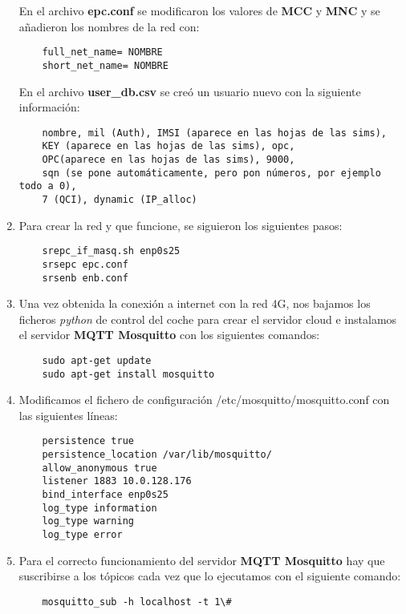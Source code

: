 \begin{enumerate}
En el archivo \textbf{epc.conf} se modificaron los valores de \textbf{MCC} y \textbf{MNC} y se añadieron los nombres de la red con:
\begin{lstlisting}
    full_net_name= NOMBRE
    short_net_name= NOMBRE
\end{lstlisting}

En el archivo \textbf{user_db.csv} se creó un usuario nuevo con la siguiente información:
\begin{lstlisting}
    nombre, mil (Auth), IMSI (aparece en las hojas de las sims),
    KEY (aparece en las hojas de las sims), opc,
    OPC(aparece en las hojas de las sims), 9000,
    sqn (se pone automáticamente, pero pon números, por ejemplo todo a 0),
    7 (QCI), dynamic (IP_alloc)
\end{lstlisting}

\item Para crear la red y que funcione, se siguieron los siguientes pasos:
\begin{lstlisting}
    srepc_if_masq.sh enp0s25
    srsepc epc.conf
    srsenb enb.conf
\end{lstlisting}

\item Una vez obtenida la conexión a internet con la red 4G, nos bajamos los ficheros \textit{python} de control del coche para crear el servidor cloud e instalamos el servidor \textbf{MQTT Mosquitto} con los siguientes comandos:

\begin{lstlisting}
	sudo apt-get update
	sudo apt-get install mosquitto
\end{lstlisting}

\item Modificamos el fichero de configuración /etc/mosquitto/mosquitto.conf con las siguientes líneas:
\begin{lstlisting}
	persistence true
	persistence_location /var/lib/mosquitto/
	allow_anonymous true
	listener 1883 10.0.128.176
	bind_interface enp0s25
	log_type information
	log_type warning
	log_type error
\end{lstlisting}

\item Para el correcto funcionamiento del servidor \textbf{MQTT Mosquitto} hay que suscribirse a los tópicos cada vez que lo ejecutamos con el siguiente comando:
\begin{lstlisting}
	mosquitto_sub -h localhost -t 1\#
\end{lstlisting}


\end{enumerate}
